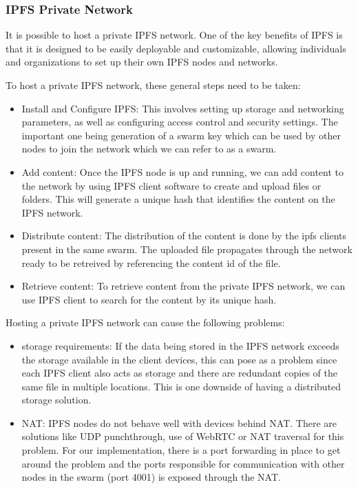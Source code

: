 \documentclass{article}
\begin{document}
\subsubsection{IPFS Private Network}
It is possible to host a private IPFS network. One of the key benefits of IPFS is that it is designed to be easily deployable and customizable, allowing individuals and organizations to set up their own IPFS nodes and networks.

To host a private IPFS network, these general steps need to be taken:

\begin{itemize}
    \item Install and Configure IPFS: This involves setting up storage and networking parameters, as well as configuring access control and security settings. The important one being generation of a swarm key which can be used by other nodes to join the network which we can refer to as a swarm.
    \item Add content: Once the IPFS node is up and running, we can add content to the network by using IPFS client software to create and upload files or folders. This will generate a unique hash that identifies the content on the IPFS network.
    \item Distribute content: The distribution of the content is done by the ipfs clients present in the same swarm. The uploaded file propagates through the network ready to be retreived by referencing the content id of the file.
    \item Retrieve content: To retrieve content from the private IPFS network, we can use IPFS client to search for the content by its unique hash.
\end{itemize}

Hosting a private IPFS network can cause the following problems:

\begin{itemize}
    \item storage requirements: If the data being stored in the IPFS network exceeds the storage available in the client devices, this can pose as a problem since each IPFS client also acts as storage and there are redundant copies of the same file in multiple locations. This is one downside of having a distributed storage solution.
    \item NAT: IPFS nodes do not behave well with devices behind NAT. There are solutions like UDP punchthrough, use of WebRTC or NAT traversal for this problem. For our implementation, there is a port forwarding in place to get around the problem and the ports responsible for communication with other nodes in the swarm (port 4001) is exposed through the NAT.
\end{itemize}
\end{document}
